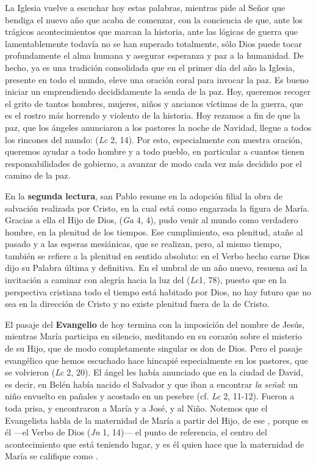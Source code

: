 {La Iglesia vuelve a escuchar hoy estas palabras, mientras pide al Señor que bendiga el nuevo año que acaba de comenzar, con la conciencia de que, ante los trágicos acontecimientos que marcan la historia, ante las lógicas de guerra que lamentablemente todavía no se han superado totalmente, sólo Dios puede tocar profundamente el alma humana y asegurar esperanza y paz a la humanidad. De hecho, ya es una tradición consolidada que en el primer día del año la Iglesia, presente en todo el mundo, eleve una oración coral para invocar la paz. Es bueno iniciar un emprendiendo decididamente la senda de la paz. Hoy, queremos recoger el grito de tantos hombres, mujeres, niños y ancianos víctimas de la guerra, que es el rostro más horrendo y violento de la historia. Hoy rezamos a fin de que la paz, que los ángeles anunciaron a los pastores la noche de Navidad, llegue a todos los rincones del mundo:  (\emph{Lc} 2, 14). Por esto, especialmente con nuestra oración, queremos ayudar a todo hombre y a todo pueblo, en particular a cuantos tienen responsabilidades de gobierno, a avanzar de modo cada vez más decidido por el camino de la paz.

En la \textbf{segunda lectura}, san Pablo resume en la adopción filial la obra de salvación realizada por Cristo, en la cual está como engarzada la figura de María. Gracias a ella el Hijo de Dios,  (\emph{Ga} 4, 4), pudo venir al mundo como verdadero hombre, en la plenitud de los tiempos. Ese cumplimiento, esa plenitud, atañe al pasado y a las esperas mesiánicas, que se realizan, pero, al mismo tiempo, también se refiere a la plenitud en sentido absoluto: en el Verbo hecho carne Dios dijo su Palabra última y definitiva. En el umbral de un año nuevo, resuena así la invitación a caminar con alegría hacia la luz del  (\emph{Lc}1, 78), puesto que en la perspectiva cristiana todo el tiempo está habitado por Dios, no hay futuro que no sea en la dirección de Cristo y no existe plenitud fuera de la de Cristo.

El pasaje del \textbf{Evangelio} de hoy termina con la imposición del nombre de Jesús, mientras María participa en silencio, meditando en su corazón sobre el misterio de su Hijo, que de modo completamente singular es don de Dios. Pero el pasaje evangélico que hemos escuchado hace hincapié especialmente en los pastores, que se volvieron  (\emph{Lc} 2, 20). El ángel les había anunciado que en la ciudad de David, es decir, en Belén había nacido el Salvador y que iban a encontrar \emph{la} \emph{señal}: un niño envuelto en pañales y acostado en un pesebre (cf. \emph{Lc} 2, 11-12). Fueron a toda prisa, y encontraron a María y a José, y al Niño. Notemos que el Evangelista habla de la maternidad de María a partir del Hijo, de ese , porque es él ---el Verbo de Dios (\emph{Jn} 1, 14)--- el punto de referencia, el centro del acontecimiento que está teniendo lugar, y es él quien hace que la maternidad de María se califique como .

}
